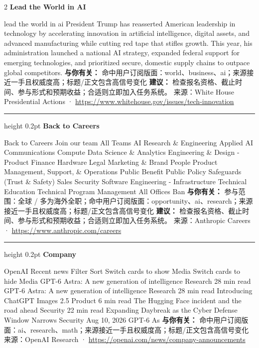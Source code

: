 \documentclass[10.5pt]{ctexart}
\begin{document}
\begin{multicols}{2}
{\large\bfseries Lead the World in AI}\par
lead the world in ai President Trump has reasserted American leadership in technology by accelerating innovation in artificial intelligence, digital assets, and advanced manufacturing while cutting red tape that stifles growth. This year, his administration launched a national AI strategy, expanded federal support for emerging technologies, and prioritized secure, domestic supply chains to outpace global competitors.
\textbf{与你有关：} 命中用户订阅版面：world、business、ai；来源接近一手且权威度高；标题/正文包含高信号变化
\textbf{建议：} 检查报名资格、截止时间、参与形式和预期收益；合适则立即加入任务系统。
{\footnotesize\color{ormuted} 来源：White House Presidential Actions · \url{https://www.whitehouse.gov/issues/tech-innovation}}
\vspace{2mm}
\hrule height 0.2pt
\vspace{2mm}
{\large\bfseries Back to Careers}\par
Back to Careers Join our team All Teams AI Research \& Engineering Applied AI Communications Compute Data Science \& Analytics Engineering \& Design - Product Finance Hardware Legal Marketing \& Brand People Product Management, Support, \& Operations Public Benefit Public Policy Safeguards (Trust \& Safety) Sales Security Software Engineering - Infrastructure Technical Education Technical Program Management All Offices Ban
\textbf{与你有关：} 参与范围：全球 / 多为海外全职；命中用户订阅版面：opportunity、ai、research；来源接近一手且权威度高；标题/正文包含高信号变化
\textbf{建议：} 检查报名资格、截止时间、参与形式和预期收益；合适则立即加入任务系统。
{\footnotesize\color{ormuted} 来源：Anthropic Careers · \url{https://www.anthropic.com/careers}}
\vspace{2mm}
\hrule height 0.2pt
\vspace{2mm}
{\large\bfseries Company}\par
OpenAI Recent news Filter Sort Switch cards to show Media Switch cards to hide Media GPT-6 Astra: A new generation of intelligence Research 28 min read GPT-6 Astra: A new generation of intelligence Research 28 min read Introducing ChatGPT Images 2.5 Product 6 min read The Hugging Face incident and the road ahead Security 22 min read Expanding Daybreak as the Cyber Defense Window Narrows Security Aug 10, 2026 GPT-6 As
\textbf{与你有关：} 命中用户订阅版面：ai、research、math；来源接近一手且权威度高；标题/正文包含高信号变化
{\footnotesize\color{ormuted} 来源：OpenAI Research · \url{https://openai.com/news/company-announcements}}

\end{multicols}
\end{document}
